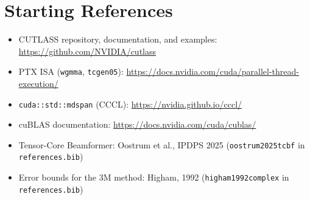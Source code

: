 \documentclass[10pt,letterpaper]{article}
\begin{document}
\section*{Starting References}
\begin{itemize}
  \item CUTLASS repository, documentation, and examples: \url{https://github.com/NVIDIA/cutlass}
  \item PTX ISA (\texttt{wgmma}, \texttt{tcgen05}): \url{https://docs.nvidia.com/cuda/parallel-thread-execution/}
  \item \texttt{cuda::std::mdspan} (CCCL): \url{https://nvidia.github.io/cccl/}
  \item cuBLAS documentation: \url{https://docs.nvidia.com/cuda/cublas/}
  \item Tensor-Core Beamformer: Oostrum et al., IPDPS 2025 (\texttt{oostrum2025tcbf} in \texttt{references.bib})
  \item Error bounds for the 3M method: Higham, 1992 (\texttt{higham1992complex} in \texttt{references.bib})
\end{itemize}
\end{document}
